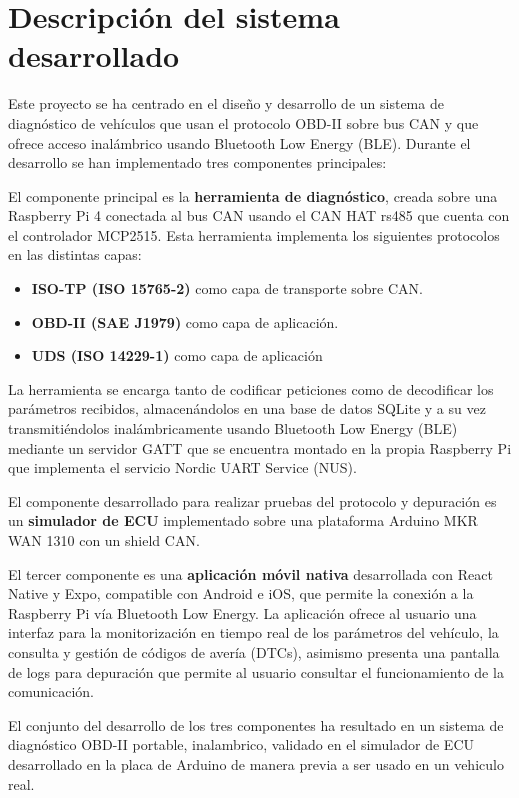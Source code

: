 \section{Descripción del sistema desarrollado}

Este proyecto se ha centrado en el diseño y desarrollo de un sistema de diagnóstico de vehículos que usan el protocolo OBD-II sobre bus CAN y que ofrece acceso inalámbrico usando Bluetooth Low Energy (BLE). Durante el desarrollo se han implementado tres componentes principales:

El componente principal es la \textbf{herramienta de diagnóstico}, creada sobre una Raspberry Pi 4 conectada al bus CAN usando el CAN HAT rs485 que cuenta con el controlador MCP2515. Esta herramienta implementa los siguientes protocolos en las distintas capas: 
\begin{itemize}
    \item \textbf{ISO-TP (ISO 15765-2)} como capa de transporte sobre CAN.
    \item \textbf{OBD-II (SAE J1979)} como capa de aplicación.
    \item \textbf{UDS  (ISO 14229-1)} como capa de aplicación
\end{itemize}

La herramienta se encarga tanto de codificar peticiones como de decodificar los parámetros recibidos, almacenándolos en una base de datos SQLite y a su vez transmitiéndolos inalámbricamente usando Bluetooth Low Energy (BLE) mediante un servidor GATT que se encuentra montado en la propia Raspberry Pi que implementa el servicio Nordic UART Service (NUS).

El componente desarrollado para realizar pruebas del protocolo y depuración es un \textbf{simulador de ECU} implementado sobre una plataforma Arduino MKR WAN 1310 con un shield CAN.

El tercer componente es una \textbf{aplicación móvil nativa} desarrollada con React Native y Expo, compatible con Android e iOS, que permite la conexión a la Raspberry Pi vía Bluetooth Low Energy. La aplicación ofrece al usuario una interfaz para la monitorización en tiempo real de los parámetros del vehículo, la consulta y gestión de códigos de avería (DTCs), asimismo presenta una pantalla de logs para depuración que permite al usuario consultar el funcionamiento de la comunicación.

El conjunto del desarrollo de los tres componentes ha resultado en un sistema de diagnóstico OBD-II portable, inalambrico, validado en el simulador de ECU desarrollado en la placa de Arduino de manera previa a ser usado en un vehiculo real.

